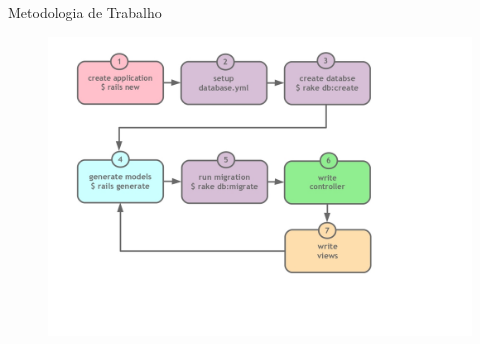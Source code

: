 \begin{frame}[fragile,t]{Metodologia de Trabalho}
	\begin{figure}[h!]
		\centering
		\includegraphics[width=.9\textwidth]{imagens/metodologia-de-trabalho.jpg}
	\end{figure}
\end{frame}

